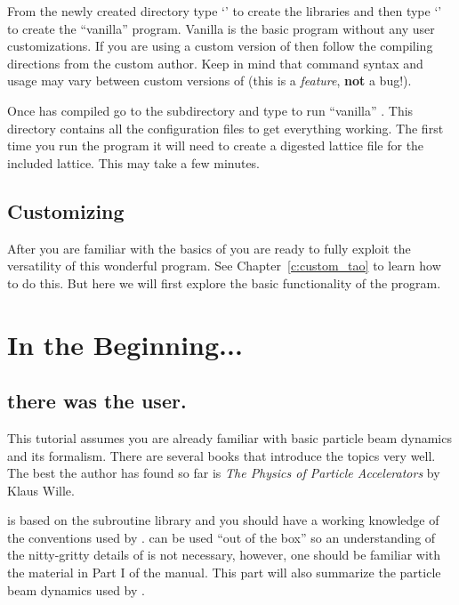 From the newly created  directory type `' to create the
libraries and then type `' to create
the ``vanilla'' \tao program. Vanilla \tao is the basic \tao program without any
user customizations. If you are using a custom version of \tao then
follow the compiling directions from the custom \tao author. Keep in mind that
command syntax and usage may vary between custom versions of \tao (this is a
\textit{feature}, \textbf{not} a bug!).

Once \tao has compiled go to the subdirectory  and type
 to run ``vanilla'' \tao. This directory contains all the
configuration files to get everything working. The first time you run the
program it will need to create a digested \bmad lattice file for the included
lattice. This may take a few minutes.

\subsection{Customizing \tao}

After you are familiar with the basics of \tao you are ready to fully exploit
the versatility of this wonderful program. See Chapter~\ref{c:custom_tao} to learn
how to do this. But here we will first explore the basic functionality of the
program.

\section{In the Beginning...}
\label{s:beginning}

\subsection{there was the user.}

This tutorial assumes you are already familiar with basic particle beam
dynamics and its formalism. There are several books that introduce the topics
very well. The best the author has found so far is \textit{The Physics of
Particle Accelerators} by Klaus Wille. 

\tao is based on the \bmad subroutine library and you should have
a working knowledge of the conventions used by \bmad. \tao can be used ``out of
the box'' so an understanding of the nitty-gritty details of \bmad is not
necessary, however, one should be familiar with the material in Part I
of the \bmad manual. This part will also summarize the particle beam dynamics
used by \tao.

